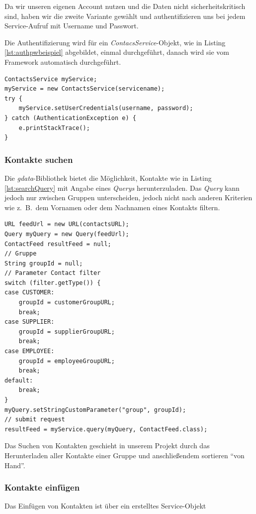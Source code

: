 Da wir unseren eigenen Account nutzen und die Daten nicht sicherheitskritisch sind, haben
 wir die zweite Variante gew\"ahlt und authentifizieren uns bei jedem Service-Aufruf mit
 Username und Passwort.

Die Authentifizierung wird für ein \emph{ContacsService}-Objekt, wie in Listing
 \ref{lst:authpwbeispiel} abgebildet, einmal durchgeführt, danach wird sie vom Framework
 automatisch durchgeführt.

\begin{lstlisting}
ContactsService myService;
myService = new ContactsService(servicename);
try {
	myService.setUserCredentials(username, password);
} catch (AuthenticationException e) {
	e.printStackTrace();
}
\end{lstlisting}

\subsubsection{Kontakte suchen}
Die \emph{gdata}-Bibliothek bietet die Möglichkeit, Kontakte wie in Listing \ref{lst:searchQuery}
 mit Angabe eines \emph{Querys} herunterzuladen.
Das \emph{Query} kann jedoch nur zwischen Gruppen unterscheiden, jedoch nicht nach anderen
 Kriterien wie z.\ B.\ dem Vornamen oder dem Nachnamen eines Kontakts filtern.

\begin{lstlisting}
URL feedUrl = new URL(contactsURL);
Query myQuery = new Query(feedUrl);
ContactFeed resultFeed = null;
// Gruppe
String groupId = null;
// Parameter Contact filter
switch (filter.getType()) {
case CUSTOMER:
	groupId = customerGroupURL;
	break;
case SUPPLIER:
	groupId = supplierGroupURL;
	break;
case EMPLOYEE:
	groupId = employeeGroupURL;
	break;
default:
	break;
}
myQuery.setStringCustomParameter("group", groupId);
// submit request
resultFeed = myService.query(myQuery, ContactFeed.class);
\end{lstlisting}

Das Suchen von Kontakten geschieht in unserem Projekt durch das Herunterladen aller Kontakte
 einer Gruppe und anschließendem sortieren "`von Hand"'.

\subsubsection{Kontakte einf\"ugen}
Das Einfügen von Kontakten ist über ein erstelltes Service-Objekt 

